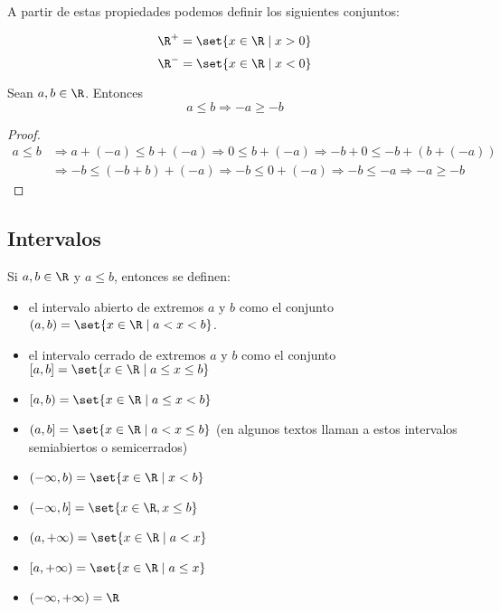 A partir de estas propiedades podemos definir los siguientes conjuntos:
\begin{definition}
	\[
		\R^{+} = \set{x \in \R \mid x > 0}
	\]
	\[
		\R^{-} = \set{x \in \R \mid x < 0}
	\]
\end{definition}
\begin{proposition}
	Sean \(a,b \in \R \). Entonces
	\[
		a \leq b \Rightarrow -a \geq -b
	\]
\end{proposition}
\begin{proof}
	\begin{align*}
		a \leq b & \Rightarrow a + (-a) \leq b + (-a) \Rightarrow 0 \leq b + (-a) \Rightarrow -b + 0 \leq -b + (b + (-a)) \\ & \Rightarrow -b \leq (-b + b) + (-a) \Rightarrow -b \leq 0 + (-a) \Rightarrow -b \leq -a \Rightarrow -a \geq -b
	\end{align*}
\end{proof}

\subsection{Intervalos}
Si \(a,b \in \R \) y \(a \leq  b \), entonces se definen:
\begin{itemize}
	\item el intervalo abierto de extremos \(a \) y \(b \) como el conjunto \((a,b) = \set{x \in \R \mid a < x < b }\).
	\item el intervalo cerrado de extremos \(a \) y \(b \) como el conjunto \([a,b] = \set{x \in \R \mid a \leq x \leq b }\)
	\item \([a,b) = \set{x \in \R \mid a \leq  x < b }\)
	\item \((a,b] = \set{x \in \R \mid a < x \leq b}\) (en algunos textos llaman a estos intervalos semiabiertos o semicerrados)
	\item \((-\infty,b) = \set{x \in \R \mid x < b }\)
	\item \((-\infty,b] = \set{x \in \R, x \leq b }\)
	\item \((a,+\infty) = \set{x \in \R \mid a < x}\)
	\item \([a,+\infty) = \set{x \in \R \mid a \leq x }\)
	\item \((-\infty, +\infty) = \R \)
\end{itemize}

